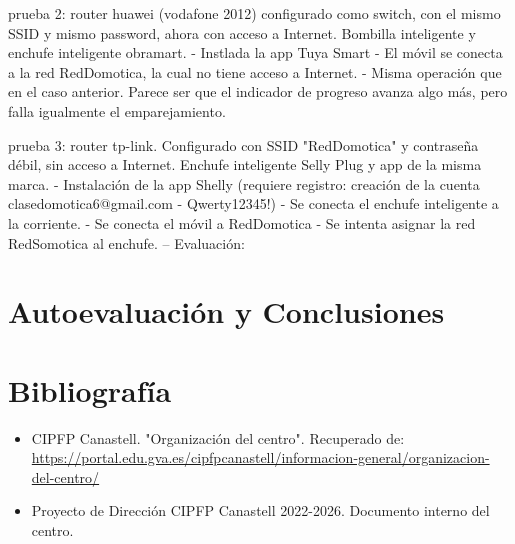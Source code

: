 \documentclass[a4paper,12pt]{report}
\begin{document}
                prueba 2: router huawei (vodafone 2012) configurado como switch, con el mismo SSID y mismo password, ahora con acceso a Internet. Bombilla inteligente y enchufe inteligente obramart. 
                    - Instlada la app Tuya Smart
                    - El móvil se conecta a la red RedDomotica, la cual no tiene acceso a Internet.
                    - Misma operación que en el caso anterior. Parece ser que el indicador de progreso avanza algo más, pero falla igualmente el emparejamiento.

                prueba 3: router tp-link. Configurado con SSID "RedDomotica" y contraseña débil, sin acceso a Internet. Enchufe inteligente Selly Plug y app de la misma marca. 
                    - Instalación de la app Shelly (requiere registro: creación de la cuenta clasedomotica6@gmail.com - Qwerty12345!)
                    - Se conecta el enchufe inteligente a la corriente. 
                    - Se conecta el móvil a RedDomotica
                    - Se intenta asignar la red RedSomotica al enchufe.
        -- Evaluación:





\chapter{Autoevaluación y Conclusiones}

\chapter*{Bibliografía}
\begin{itemize}
  \item CIPFP Canastell. "Organización del centro". Recuperado de: \url{https://portal.edu.gva.es/cipfpcanastell/informacion-general/organizacion-del-centro/}
  \item Proyecto de Dirección CIPFP Canastell 2022-2026. Documento interno del centro.
\end{itemize}
\end{document}
